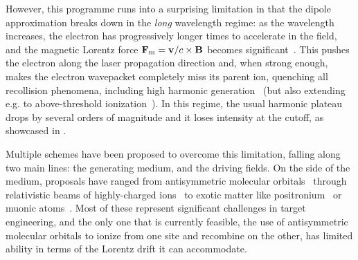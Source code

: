 However, this programme runs into a surprising limitation in that the dipole approximation breaks down in the \textit{long} wavelength regime: as the wavelength increases, the electron has progressively longer times to accelerate in the field, and the magnetic Lorentz force $\vb{F}_\mathrm{m}=\vb{v}/c \times \vb{B}$ becomes significant~\cite{reiss_dipole-approximation_2000}. This pushes the electron along the laser propagation direction and, when strong enough, makes the electron wavepacket completely miss its parent ion, quenching all recollision phenomena, including high harmonic generation~\cite{potvliege_photon_2000, walser_hhg_2000,kylstra_photon_2001, kylstra_photon_2002, chirila_analysis_2004, chirila_nondipole_2002, milosevic_relativistic_2002, milosevic_relativistic_2002-1, emelina_possibility_2014} (but also extending e.g. to above-threshold ionization~\cite{klaiber_above-threshold_2005}). In this regime, the usual harmonic plateau drops by several orders of magnitude and it loses intensity at the cutoff, as showcased in .


Multiple schemes have been proposed to overcome this limitation, falling along two main lines: the generating medium, and the driving fields. On the side of the medium, proposals have ranged from 
%
antisymmetric molecular orbitals~\cite{ fischer_enhanced_2006} 
%
through relativistic beams of highly-charged ions~\cite{ mocken_bound-mev_2004, avetissian_high-order_2011}
% 
to exotic matter like positronium~\cite{henrich_positronium_2004, hatsagortsyan_microscopic_2006} 
%
or muonic atoms~\cite{muller_exotic_2009}. 
%
Most of these represent significant challenges in target engineering, and the only one that is currently feasible, the use of antisymmetric molecular orbitals to ionize from one site and recombine on the other, has limited ability in terms of the Lorentz drift it can accommodate.



